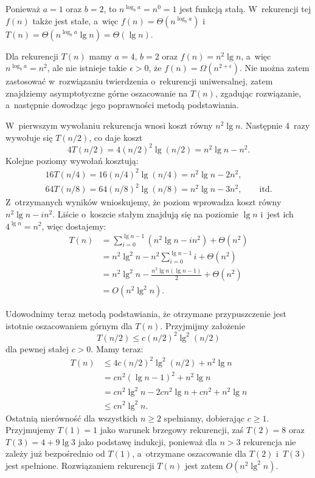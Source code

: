 \exercise %
Ponieważ $a=1$ oraz $b=2$, to $n^{\log_ba}=n^0=1$ jest funkcją stałą. W~rekurencji tej $f(n)$ także jest stałe, a~więc $f(n)=\Theta(n^{\log_ba})$ i~$T(n)=\Theta(n^{\log_ba}\lg n)=\Theta(\lg n)$.

\exercise %
Dla rekurencji $T(n)$ mamy $a=4$, $b=2$ oraz $f(n)=n^2\lg n$, a~więc $n^{\log_ba}=n^2$, ale nie istnieje takie $\epsilon>0$, że $f(n)=\Omega(n^{2+\epsilon})$. Nie można zatem zastosować w~rozwiązaniu twierdzenia o~rekurencji uniwersalnej, zatem znajdziemy asymptotyczne górne oszacowanie na $T(n)$, zgadując rozwiązanie, a~następnie dowodząc jego poprawności metodą podstawiania.

W~pierwszym wywołaniu rekurencja wnosi koszt równy $n^2\lg n$. Następnie 4~razy wywołuje się $T(n/2)$, co daje koszt
\[
	4T(n/2) = 4(n/2)^2\lg(n/2) = n^2\lg n-n^2.
\]
Kolejne poziomy wywołań kosztują:
\begin{gather*}
	16T(n/4) = 16(n/4)^2\lg(n/4) = n^2\lg n-2n^2, \qquad\phantom{\text{itd.}} \\
	64T(n/8) = 64(n/8)^2\lg(n/8) = n^2\lg n-3n^2, \qquad\text{itd.}
\end{gather*}
Z~otrzymanych wyników wnioskujemy, że  poziom wprowadza koszt równy $n^2\lg n-in^2$. Liście o~koszcie stałym znajdują się na poziomie $\lg n$ i~jest ich $4^{\lg n}=n^2$, więc dostajemy:
\begin{align*}
	T(n) &= \sum_{i=0}^{\lg n-1}(n^2\lg n-in^2)+\Theta(n^2) \\
	&= n^2\lg^2n-n^2\sum_{i=0}^{\lg n-1}i+\Theta(n^2) \\[1mm]
	&= n^2\lg^2n-\frac{n^2\lg n(\lg n-1)}{2}+\Theta(n^2) \\[1mm]
	&= O(n^2\lg^2n).
\end{align*}

Udowodnimy teraz metodą podstawiania, że otrzymane przypuszczenie jest istotnie oszacowaniem górnym dla $T(n)$. Przyjmijmy założenie
\[
	T(n/2) \le c(n/2)^2\lg^2(n/2)
\]
dla pewnej stałej $c>0$. Mamy teraz:
\begin{align*}
	T(n) &\le 4c(n/2)^2\lg^2(n/2)+n^2\lg n \\
	&= cn^2(\lg n-1)^2+n^2\lg n \\
	&= cn^2\lg^2n-2cn^2\lg n+cn^2+n^2\lg n \\
	&\le cn^2\lg^2n.
\end{align*}
Ostatnią nierówność dla wszystkich $n\ge2$ spełniamy, dobierając $c\ge1$. Przyjmujemy $T(1)=1$ jako warunek brzegowy rekurencji, zaś $T(2)=8$ oraz $T(3)=4+9\lg3$ jako podstawę indukcji, ponieważ dla $n>3$ rekurencja nie zależy już bezpośrednio od $T(1)$, a~otrzymane oszacowanie dla $T(2)$ i~$T(3)$ jest spełnione. Rozwiązaniem rekurencji $T(n)$ jest zatem $O(n^2\lg^2n)$.

